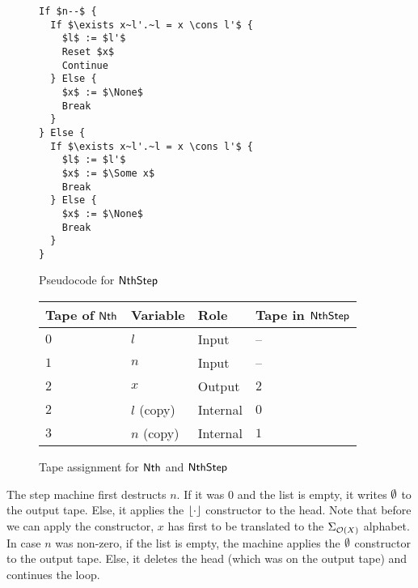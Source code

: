 \begin{figure}[!htb]
  \begin{minipage}{0.3\textwidth}
    \small
\begin{lstlisting}[style=pseudocode]
If $n--$ {
  If $\exists x~l'.~l = x \cons l'$ {
    $l$ := $l'$
    Reset $x$
    Continue
  } Else {
    $x$ := $\None$
    Break
  }
} Else {
  If $\exists x~l'.~l = x \cons l'$ {
    $l$ := $l'$
    $x$ := $\Some x$
    Break
  } Else {
    $x$ := $\None$
    Break
  }
}
\end{lstlisting}
    \caption{Pseudocode for $\mathsf{NthStep}$}
    \label{fig:pseudo-NthStep}
  \end{minipage}%
  \begin{minipage}{0.7\textwidth}
    \begin{tabular}{|l|l|l|l|}
      \hline Tape of $\mathsf{Nth}$ & Variable & Role & Tape in $\mathsf{NthStep}$ \\ \hline \hline
      $0$ & $l$        & Input    & --  \\ \hline
      $1$ & $n$        & Input    & --  \\ \hline
      $2$ & $x$        & Output   & $2$ \\ \hline
      $2$ & $l$ (copy) & Internal & $0$ \\ \hline
      $3$ & $n$ (copy) & Internal & $1$ \\ \hline
    \end{tabular}
    \caption{Tape assignment for $\mathsf{Nth}$ and $\mathsf{NthStep}$}
    \label{fig:tapes-Nth}
  \end{minipage}
\end{figure}


The step machine first destructs $n$.  If it was $0$ and the list is empty, it writes $\emptyset$ to the output tape.  Else, it applies the $\left\lfloor {\cdot} \right\rfloor$
constructor to the head.  Note that before we can apply the constructor, $x$ has first to be translated to the $\Sigma_{\mathcal{O}(X)}$ alphabet.  In
case $n$ was non-zero, if the list is empty, the machine applies the $\emptyset$ constructor to the output tape.  Else, it deletes the head (which was on
the output tape) and continues the loop.

